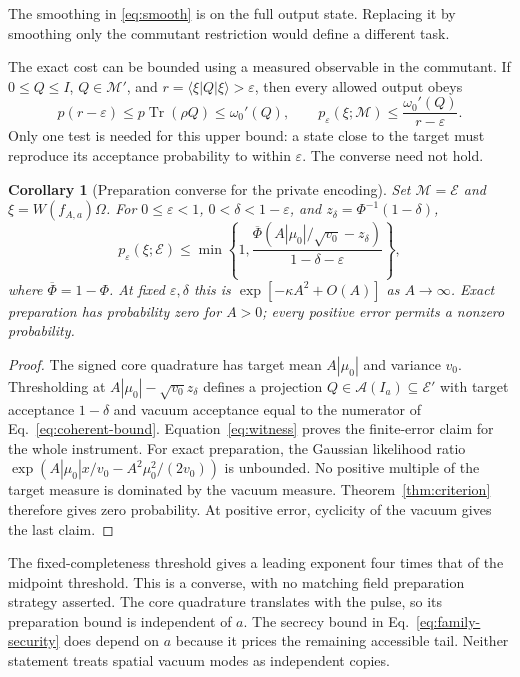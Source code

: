 \documentclass[11pt,a4paper]{article}
\newtheorem{corollary}[theorem]{Corollary}
\newcommand{\M}{\mathcal M}
\newcommand{\A}{\mathcal A}
\newcommand{\tr}{\operatorname{Tr}}
\newcommand{\ket}[1]{\lvert #1\rangle}
\newcommand{\bra}[1]{\langle #1\rvert}
\newcommand{\E}{\mathcal E}
\begin{document}
The smoothing in \eqref{eq:smooth} is on the full output state. Replacing it
by smoothing only the commutant restriction would define a different task.

The exact cost can be bounded using a measured observable in the commutant. If
$0\le Q\le I$, $Q\in\M'$, and $r=\bra\xi Q\ket\xi>\varepsilon$,
then every allowed output obeys
\begin{equation}
p(r-\varepsilon)\le p\tr(\rho Q)\le\omega_0'(Q),
\qquad
p_\varepsilon(\xi;\M)\le\frac{\omega_0'(Q)}{r-\varepsilon}.
\label{eq:witness}
\end{equation}
Only one test is needed for this upper bound: a state close to the target
must reproduce its acceptance probability to within $\varepsilon$. The
converse need not hold.

\begin{corollary}[Preparation converse for the private encoding]
\label{cor:coherent}
Set $\M=\E$ and $\xi=W(f_{A,a})\Omega$. For
$0\le\varepsilon<1$, $0<\delta<1-\varepsilon$, and
$z_\delta=\Phi^{-1}(1-\delta)$,
\begin{equation}
p_\varepsilon(\xi;\E)\le\min\left\{1,
\frac{\overline\Phi(A|\mu_0|/\sqrt{v_0}-z_\delta)}
{1-\delta-\varepsilon}\right\},
\label{eq:coherent-bound}
\end{equation}
where $\overline\Phi=1-\Phi$. At fixed $\varepsilon,\delta$ this is
$\exp[-\kappa A^2+O(A)]$ as $A\to\infty$.
Exact preparation has probability zero for $A>0$; every positive error
permits a nonzero probability.
\end{corollary}

\begin{proof}
The signed core quadrature has target mean $A|\mu_0|$ and variance $v_0$.
Thresholding at $A|\mu_0|-\sqrt{v_0}z_\delta$ defines a projection
$Q\in\A(I_a)\subseteq\E'$ with target acceptance $1-\delta$ and vacuum
acceptance equal to the numerator of Eq.~\eqref{eq:coherent-bound}.
Equation~\eqref{eq:witness} proves the finite-error claim for the whole
instrument. For exact preparation, the Gaussian likelihood ratio
$\exp(A|\mu_0|x/v_0-A^2\mu_0^2/(2v_0))$ is unbounded. No positive multiple
of the target measure is dominated by the vacuum measure. Theorem~\ref{thm:criterion}
therefore gives zero probability. At positive error, cyclicity of the
vacuum gives the last claim.
\end{proof}

The fixed-completeness threshold gives a leading exponent four times that
of the midpoint threshold. This is a converse, with no matching field
preparation strategy asserted. The core quadrature translates with the
pulse, so its preparation bound is independent of $a$. The secrecy bound
in Eq.~\eqref{eq:family-security} does depend on $a$ because it prices the
remaining accessible tail. Neither statement treats spatial vacuum modes
as independent copies.
\end{document}

